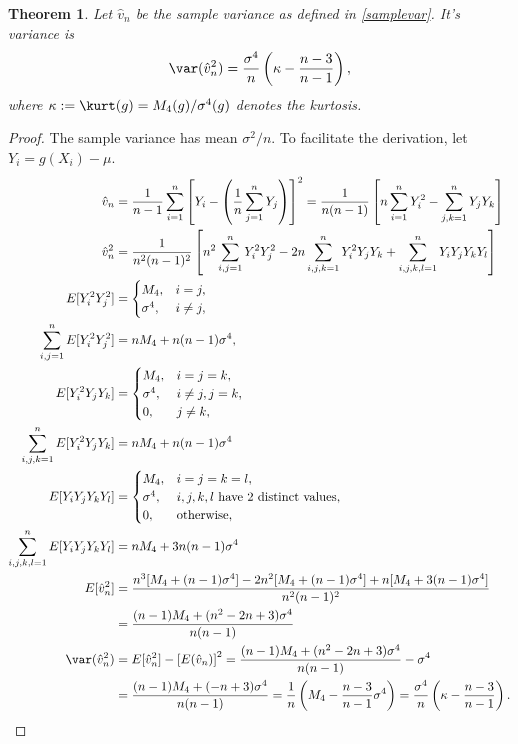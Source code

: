 \documentclass[12pt]{amsart}
\newcommand{\hv}{\hat{v}}
\newtheorem{theorem}{Theorem}
\begin{document}
\begin{theorem} \label{Varvarthm} Let $\hv_n$ be the sample variance as defined in \eqref{samplevar}.  It's variance is
\[
\var(\hv_n^2) = \frac{\sigma^4}{n} \left ( \kappa  - \frac{n-3}{n-1} \right),
\]
where $\kappa:= \kurt(g) = M_4(g)/\sigma^4(g)$ denotes the \emph{kurtosis}.
\end{theorem}
\begin{proof}The sample variance has mean $\sigma^2/n$.  To facilitate the derivation, let $Y_i=g(X_i) - \mu$.
\begin{align*}
\hv_n & =  \frac 1{n-1} \sum_{i=1}^n \left[Y_i- \left(\frac 1n \sum_{j=1}^n Y_j\right) \right]^2
=  \frac 1{n(n-1)}\left[ n \sum_{i=1}^n Y^2_i-  \sum_{j,k=1}^n Y_jY_k \right] \\
\hv_n^2 & = \frac 1{n^2(n-1)^2}\left[ n^2 \sum_{i,j=1}^n Y^2_i Y^2_j  - 2 n \sum_{i,j,k=1}^n Y^2_i Y_j Y_k +  \sum_{i,j,k,l=1}^n Y_iY_j Y_k Y_l\right] \\
E[ Y^2_i Y^2_j] & = \begin{cases} M_4, & i=j,\\
\sigma^4, & i \ne j,
\end{cases}\\
\sum_{i,j=1}^n E[Y^2_i Y^2_j]&= n M_4 + n(n-1)\sigma^4, \\
E[ Y^2_i Y_j Y_k] & = \begin{cases} M_4, & i=j=k,\\
\sigma^4, & i \ne j, j=k,\\
0, & j \ne k,
\end{cases} \\
\sum_{i,j,k=1}^n E[Y^2_i Y_j Y_k] &= nM_4  + n(n-1)\sigma^4 \\
E[ Y_i Y_j Y_k Y_l] & = \begin{cases} M_4, & i=j=k=l,\\
\sigma^4, & i, j, k, l \text{ have 2 distinct values},\\
0, & \text{otherwise},
\end{cases}\\
\sum_{i,j,k,l=1}^n E[Y_iY_j Y_k Y_l] &= n M_4 + 3n(n-1)\sigma^4 \\
E[\hv_n^2] & = \frac{ n^3[M_4 + (n-1)\sigma^4]  - 2 n^2 [M_4 + (n-1)\sigma^4] +  n[M_4 + 3(n-1)\sigma^4]} {n^2(n-1)^2} \\
& = \frac{ (n-1)M_4 + (n^2-2n+3)\sigma^4} {n(n-1)} \\
\var(\hv_n^2) & = E[\hv_n^2] - \left[E(\hv_n)\right]^2 = \frac{ (n-1)M_4 + (n^2-2n+3)\sigma^4} {n(n-1)} -\sigma^4\\
& = \frac{(n-1)M_4 + (-n+3)\sigma^4} {n(n-1)}= \frac{1}{n} \left ( M_4 - \frac{n-3}{n-1} \sigma^4 \right) = \frac{\sigma^4}{n} \left ( \kappa  - \frac{n-3}{n-1} \right).
\end{align*}
\end{proof}
\end{document}
